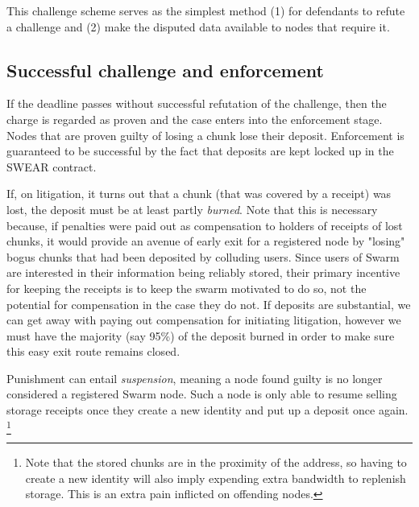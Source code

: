 This challenge scheme serves as the simplest method (1) for defendants to refute a challenge and (2) make the disputed data available to nodes that require it.

\subsection{Successful challenge and enforcement}

If the deadline passes without successful refutation of the challenge, then the charge is regarded as proven and the case enters into the enforcement stage. Nodes that are proven guilty of losing a chunk lose their deposit. Enforcement is guaranteed to be successful by the fact that deposits are kept locked up in the SWEAR contract.

If, on litigation, it turns out that a chunk (that was covered by a receipt) was lost, the deposit must be at least partly \emph{burned}. Note that this is necessary because, if penalties were paid out as compensation to holders of receipts of lost chunks, it would provide an avenue of early exit for a registered node by "losing" bogus chunks that had been deposited by colluding users. Since users of Swarm are interested in their information being reliably stored, their primary incentive for keeping the receipts is to keep the swarm motivated to do so, not the potential for compensation in the case they do not. If deposits are substantial, we can get away with paying out compensation for initiating litigation, however we must have the majority (say 95\%) of the deposit burned in order to make sure this easy exit route remains closed.

Punishment can entail \emph{suspension}, meaning a node found guilty is no longer considered a registered Swarm node. Such a node is only able to resume selling storage receipts once they create a new identity and put up a deposit once again.%
%
\footnote{Note that the stored chunks are in the proximity of the address, so having to create a new identity will also imply expending extra bandwidth to replenish storage. This is an extra pain inflicted on offending nodes.}




